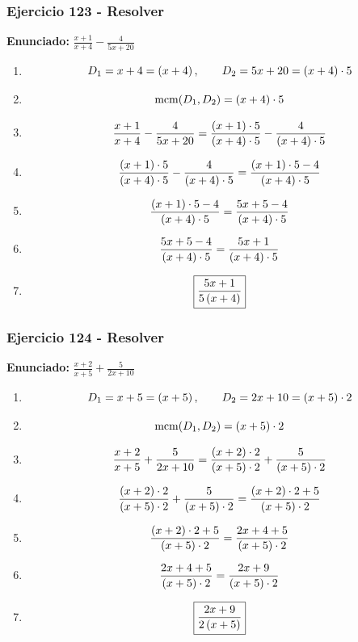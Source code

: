 \documentclass[11pt,a4paper]{article}
\newcommand{\fitmath}[1]{%
\[
\setbox0=\hbox{$\displaystyle #1$}%
\ifdim\wd0>\linewidth
\resizebox{\linewidth}{!}{$\displaystyle #1$}%
\else
#1%
\fi
\]
}
\begin{document}
\vspace{0.12cm}
\subsubsection*{Ejercicio 123 - Resolver}
\textbf{Enunciado:} $ \frac{x + 1}{x + 4} - \frac{4}{5 x + 20} $\par
\begin{enumerate}[leftmargin=2em]
\item \fitmath{D_1=x + 4=\left(x + 4\right),\qquad D_2=5 x + 20=\left(x + 4\right)\cdot 5}
\item \fitmath{\operatorname{mcm}(D_1,D_2)=\left(x + 4\right)\cdot 5}
\item \fitmath{\frac{x + 1}{x + 4} - \frac{4}{5 x + 20}= \frac{\left(x + 1\right)\cdot 5}{\left(x + 4\right)\cdot 5} - \frac{4}{\left(x + 4\right)\cdot 5}}
\item \fitmath{\frac{\left(x + 1\right)\cdot 5}{\left(x + 4\right)\cdot 5} - \frac{4}{\left(x + 4\right)\cdot 5}=\frac{\left(x + 1\right)\cdot 5 - 4}{\left(x + 4\right)\cdot 5}}
\item \fitmath{\frac{\left(x + 1\right)\cdot 5 - 4}{\left(x + 4\right)\cdot 5}=\frac{5 x + 5 - 4}{\left(x + 4\right)\cdot 5}}
\item \fitmath{\frac{5 x + 5 - 4}{\left(x + 4\right)\cdot 5}=\frac{5 x + 1}{\left(x + 4\right)\cdot 5}}
\item \fitmath{\boxed{\frac{5 x + 1}{5 \left(x + 4\right)}}}
\end{enumerate}

\vspace{0.12cm}
\subsubsection*{Ejercicio 124 - Resolver}
\textbf{Enunciado:} $ \frac{x + 2}{x + 5} + \frac{5}{2 x + 10} $\par
\begin{enumerate}[leftmargin=2em]
\item \fitmath{D_1=x + 5=\left(x + 5\right),\qquad D_2=2 x + 10=\left(x + 5\right)\cdot 2}
\item \fitmath{\operatorname{mcm}(D_1,D_2)=\left(x + 5\right)\cdot 2}
\item \fitmath{\frac{x + 2}{x + 5} + \frac{5}{2 x + 10}= \frac{\left(x + 2\right)\cdot 2}{\left(x + 5\right)\cdot 2} + \frac{5}{\left(x + 5\right)\cdot 2}}
\item \fitmath{\frac{\left(x + 2\right)\cdot 2}{\left(x + 5\right)\cdot 2} + \frac{5}{\left(x + 5\right)\cdot 2}=\frac{\left(x + 2\right)\cdot 2 + 5}{\left(x + 5\right)\cdot 2}}
\item \fitmath{\frac{\left(x + 2\right)\cdot 2 + 5}{\left(x + 5\right)\cdot 2}=\frac{2 x + 4 + 5}{\left(x + 5\right)\cdot 2}}
\item \fitmath{\frac{2 x + 4 + 5}{\left(x + 5\right)\cdot 2}=\frac{2 x + 9}{\left(x + 5\right)\cdot 2}}
\item \fitmath{\boxed{\frac{2 x + 9}{2 \left(x + 5\right)}}}
\end{enumerate}
\end{document}
